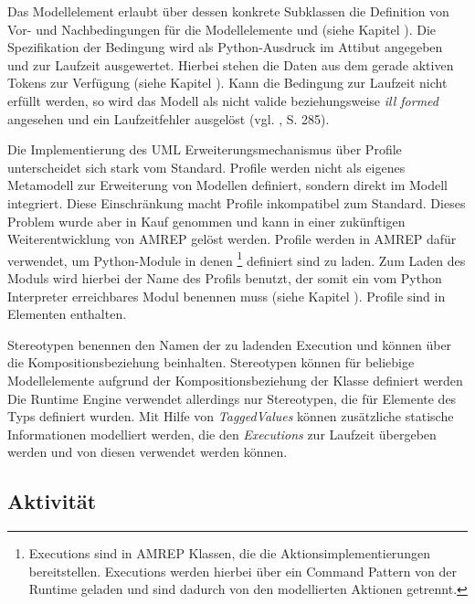 Das Modellelement  erlaubt über dessen konkrete Subklassen die Definition von Vor- und Nachbedingungen für die Modellelemente  und  (siehe Kapitel ). Die Spezifikation der Bedingung wird als Python-Ausdruck im Attibut  angegeben und zur Laufzeit ausgewertet. Hierbei stehen die Daten aus dem gerade aktiven Tokens zur Verfügung (siehe Kapitel ). Kann die Bedingung zur Laufzeit nicht erfüllt werden, so wird das Modell als nicht valide beziehungsweise \emph{ill formed} angesehen und ein Laufzeitfehler ausgelöst (vgl. \citep{RumbaughJacobsonBooch2005}, S. 285).

Die Implementierung des UML Erweiterungsmechanismus über Profile unterscheidet sich stark vom Standard. Profile werden nicht als eigenes Metamodell zur Erweiterung von Modellen definiert, sondern direkt im Modell integriert. Diese Einschränkung macht Profile inkompatibel zum Standard. Dieses Problem wurde aber in Kauf genommen und kann in einer zukünftigen Weiterentwicklung von AMREP gelöst werden. Profile werden in AMREP dafür verwendet, um Python-Module in denen \footnote
{Executions sind in AMREP Klassen, die die Aktionsimplementierungen bereitstellen. Executions werden hierbei über ein Command Pattern von der Runtime geladen und sind dadurch von den modellierten Aktionen getrennt.}
definiert sind zu laden. Zum Laden des Moduls wird hierbei der Name des Profils benutzt, der somit ein vom Python Interpreter erreichbares Modul benennen muss (siehe Kapitel ). Profile sind in  Elementen enthalten.

Stereotypen benennen den Namen der zu ladenden Execution und können  über die Kompositionsbeziehung  beinhalten. Stereotypen können für beliebige Modellelemente aufgrund der Kompositionsbeziehung  der Klasse  definiert werden Die Runtime Engine verwendet allerdings nur Stereotypen, die für Elemente des Typs  definiert wurden. Mit Hilfe von \emph{TaggedValues} können zusätzliche statische Informationen modelliert werden, die den \emph{Executions} zur Laufzeit übergeben werden und von diesen verwendet werden können.


\subsection{Aktivität}

